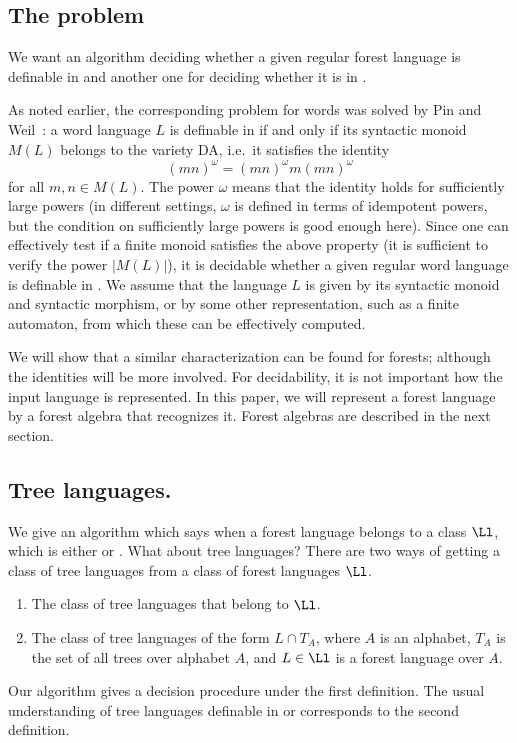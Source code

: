 \documentclass{LMCS}
\begin{document}
\subsection{The problem}

We want an algorithm deciding whether a given regular forest language is
definable in \Dtwol and another one for deciding whether it is in \Dtwo.

As noted earlier, the corresponding problem for words was solved by
Pin and Weil~\cite{weilpinpoly}: a word language $L$ is definable in
\Dtwo if and only if its syntactic monoid $M(L)$ belongs to the
variety DA, i.e.~it satisfies the identity
\[
(mn)^\omega = (mn)^\omega m (mn)^\omega
\]
\noindent
for all $m,n\in M(L)$. The power $\omega$ means that
the identity holds for sufficiently large powers (in different
settings, $\omega$ is defined in terms of idempotent powers, but the
condition on sufficiently large powers is good enough here).  Since
one can effectively test if a finite monoid satisfies the above
property (it is sufficient to verify the power $|M(L)|$), it is
decidable whether a given regular word language is definable in
\Dtwo. We assume that the language $L$ is given by its syntactic
monoid and syntactic morphism, or by some other representation, such
as a finite automaton, from which these can be effectively computed.



We will show that a similar characterization can be found for forests;
although the identities will be more involved.  For decidability, it
is not important how the input language is represented. In this paper,
we will represent a forest language by a forest algebra that
recognizes it.  Forest algebras are described in the next section.

\subsection{Tree languages.}
We give an algorithm which says when a forest language belongs to a class $\Ll$, which is either \Dtwo or \Dtwol.
What about tree languages? There are two ways of getting a class of tree languages from a class of forest languages $\Ll$. 
\begin{enumerate}[(1)]
\item The class of tree languages that belong to $\Ll$.
\item The class of tree languages of the form $L \cap T_A$, where $A$ is an alphabet,  $T_A$ is the set of all trees over alphabet $A$, and $L \in \Ll$ is a forest language over $A$.
\end{enumerate}
Our algorithm gives a decision procedure under the first definition. The usual understanding of  tree languages definable in \Dtwo or \Dtwol corresponds to the second definition.
\end{document}
